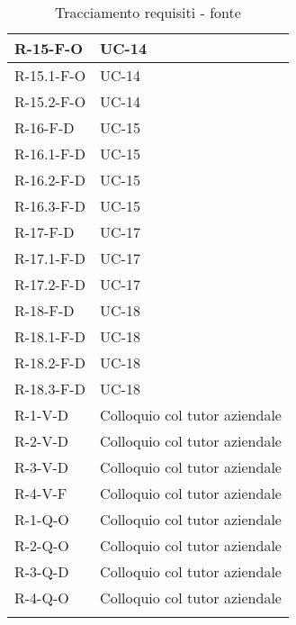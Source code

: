 \begin{center}
\begin{longtable}{| C{6cm} |C{6cm}|}
        R-15-F-O & UC-14\\\hline
        R-15.1-F-O & UC-14\\\hline
        R-15.2-F-O & UC-14\\\hline
        R-16-F-D & UC-15 \\\hline
        R-16.1-F-D & UC-15 \\\hline
        R-16.2-F-D & UC-15 \\\hline
        R-16.3-F-D & UC-15 \\\hline
        R-17-F-D & UC-17 \\\hline
        R-17.1-F-D & UC-17 \\\hline
        R-17.2-F-D & UC-17 \\\hline
        R-18-F-D & UC-18 \\\hline
        R-18.1-F-D & UC-18 \\\hline
        R-18.2-F-D & UC-18 \\\hline
        R-18.3-F-D & UC-18 \\\hline
        R-1-V-D& Colloquio col tutor aziendale\\\hline
        R-2-V-D& Colloquio col tutor aziendale\\\hline
        R-3-V-D& Colloquio col tutor aziendale\\\hline
        R-4-V-F& Colloquio col tutor aziendale\\\hline
        R-1-Q-O& Colloquio col tutor aziendale\\\hline
        R-2-Q-O& Colloquio col tutor aziendale\\\hline
        R-3-Q-D& Colloquio col tutor aziendale\\\hline
        R-4-Q-O& Colloquio col tutor aziendale\\\hline
        \caption{Tracciamento requisiti - fonte}
    \end{longtable}
\end{center}